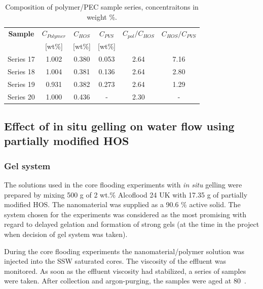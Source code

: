 \documentclass[energies,article,submit,moreauthors,pdftex]{Definitions/mdpi}
\begin{document}
\begin{table}[h!] 

\centering
\caption{Composition of polymer/PEC sample series, concentraitons in weight \%.}
\label{tab:polyPecComp}
\begin{tabular}{c c c c c c } 
\toprule
\textbf{Sample} & \textbf{$C_{Polymer}$} & \textbf{$C_{HOS}$} & \textbf{$C_{PVS}$} & \textbf{$C_{pol}/C_{HOS}$} & \textbf{$C_{HOS}/C_{PVS}$} \\ 
&[wt\%]& [wt\%] & [wt\%] && \\
\midrule 
Series 17   & 1.002   & 0.380 & 0.053 & 2.64 & 7.16\\
Series 18   & 1.004   & 0.381 & 0.136 & 2.64 & 2.80\\ 
Series 19   & 0.931   & 0.382 & 0.273 & 2.64 & 1.29\\ 
Series 20   & 1.000   & 0.436 & - & 2.30     & - \\
\bottomrule
\end{tabular}
\end{table}

\subsection{Effect of in situ gelling on water flow using partially modified HOS \label{sec:lactamide}}
\subsubsection{Gel system}
The solutions used in the core flooding experiments with \textit{in situ} gelling were prepared by mixing 500 g of 2 wt.\% Alcoflood 24 UK with 17.35 g of partially modified HOS. The nanomaterial was supplied as a 90.6 \% active solid. The system chosen for the experiments was considered as the most promising with regard to delayed gelation and formation of strong gels (at the time in the project when decision of gel system was taken).

During the core flooding experiments the nanomaterial/polymer solution was injected into the SSW saturated cores. The viscosity of the effluent was monitored. As soon as the effluent viscosity had stabilized, a series of samples were taken. After collection and argon-purging, the samples were aged at 80~\celsius. 
\end{document}
